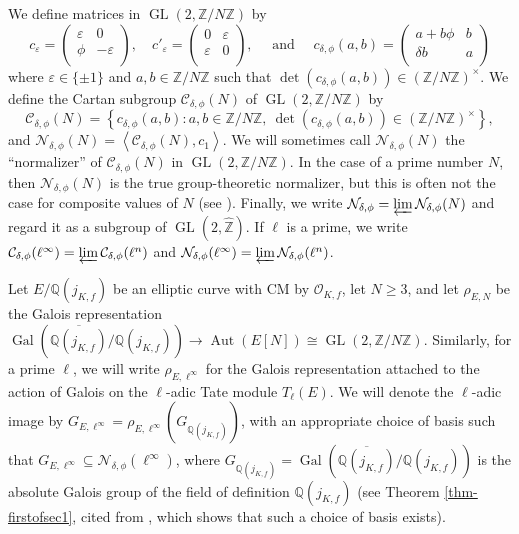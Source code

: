 \documentclass[11pt]{amsart}
\theoremstyle{definition}
\newcommand{\Q}{\mathbb Q}
\newcommand{\Z}{\mathbb Z}
\newcommand{\cC}{\mathcal{C}}
\newcommand{\OO}{\mathcal{O}}
\newcommand{\Gal}{\operatorname{Gal}}
\newcommand{\Aut}{\operatorname{Aut}}
\newcommand{\GL}{\operatorname{GL}}
\begin{document}
We define matrices in $\GL(2,\Z/N\Z)$ by
$$c_\varepsilon=\left(\begin{array}{cc} \varepsilon & 0\\ \phi & -\varepsilon\\\end{array}\right),\quad c'_\varepsilon = \left(\begin{array}{cc} 0 & \varepsilon \\ \varepsilon & 0 \\ \end{array}\right), \quad \text{ and } \quad c_{\delta,\phi}(a,b)=\left(\begin{array}{cc}a+b\phi & b\\ \delta b & a\\ \end{array}\right)$$ where $\varepsilon \in \{\pm 1\}$ and $a,b \in \Z/N\Z$ such that $\det(c_{\delta,\phi}(a,b))\in (\Z/N\Z)^\times$. 
We define the Cartan subgroup $\cC_{\delta,\phi}(N)$ of $\GL(2,\Z/N\Z)$ by
$$\cC_{\delta,\phi}(N)=\left\{c_{\delta,\phi}(a,b): a,b\in\Z/N\Z,\  \det(c_{\delta,\phi}(a,b)) \in (\Z/N\Z)^\times \right\},$$
and $\mathcal{N}_{\delta,\phi}(N) = \left\langle \cC_{\delta,\phi}(N),c_1\right\rangle$. We will sometimes call $\mathcal{N}_{\delta,\phi}(N)$ the ``normalizer'' of $\cC_{\delta,\phi}(N)$ in $\GL(2,\Z/N\Z)$. In the case of a prime number $N$, then $\mathcal{N}_{\delta,\phi}(N)$ is the true group-theoretic normalizer, but this is often not the case for composite values of $N$ (see \cite[Section 5]{lozano-galoiscm}). Finally, we write $\mathcal{N}_{\delta,\phi} = \varprojlim \mathcal{N}_{\delta,\phi}(N)$ and regard it as a subgroup of $\GL(2,\widehat{\Z})$. If $\ell$ is a prime, we write  $\cC_{\delta,\phi}(\ell^{\infty}) = \varprojlim \cC_{\delta,\phi}(\ell^n)$ and $\mathcal{N}_{\delta,\phi}(\ell^{\infty}) = \varprojlim \mathcal{N}_{\delta,\phi}(\ell^n)$.

Let $E/\Q(j_{K,f})$ be an elliptic curve with CM by $\OO_{K,f}$, let $N\geq 3$, and let $\rho_{E,N}$ be the Galois representation $\Gal(\overline{\Q(j_{K,f})}/\Q(j_{K,f})) \to \Aut(E[N])\cong \GL(2,\Z/N\Z)$. Similarly, for a prime $\ell$, we will write $\rho_{E,\ell^\infty}$ for the Galois representation attached to the action of Galois on the $\ell$-adic Tate module $T_\ell(E)$. We will denote the $\ell$-adic image by $G_{E,\ell^\infty} = \rho_{E,\ell^{\infty}}(G_{\Q(j_{K,f})})$, with an appropriate choice of basis such that $G_{E,\ell^\infty} \subseteq \mathcal{N}_{\delta,\phi}(\ell^{\infty})$, where $G_{\Q(j_{K,f})}=\Gal(\overline{\Q(j_{K,f})}/\Q(j_{K,f}))$ is the absolute Galois group of the field of definition $\Q(j_{K,f})$ (see Theorem \ref{thm-firstofsec1}, cited from \cite{lozano-galoiscm}, which shows that such a choice of basis exists).
\end{document}
